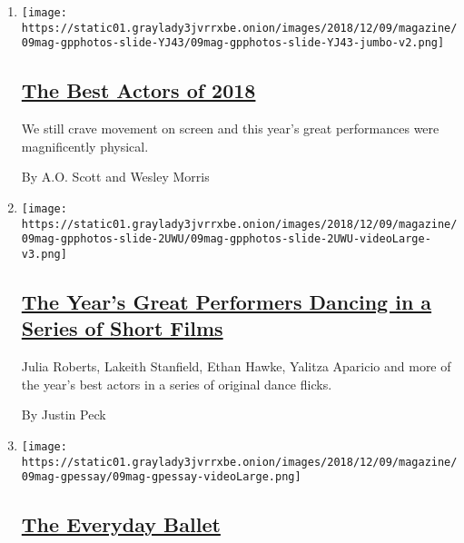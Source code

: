 \begin{enumerate}
\def\labelenumi{\arabic{enumi}.}
\item
  \texttt{[image: https://static01.graylady3jvrrxbe.onion/images/2018/12/09/magazine/09mag-gpphotos-slide-YJ43/09mag-gpphotos-slide-YJ43-jumbo-v2.png]}

  \hypertarget{the-best-actors-of-2018}{%
  \subsection{\texorpdfstring{\href{/interactive/2018/12/05/magazine/great-performers-best-actors-2018.html}{The
  Best Actors of
  2018}}{The Best Actors of 2018}}\label{the-best-actors-of-2018}}

  We still crave movement on screen and this year's great performances
  were magnificently physical.

  By A.O. Scott and Wesley Morris
\item
  \texttt{[image: https://static01.graylady3jvrrxbe.onion/images/2018/12/09/magazine/09mag-gpphotos-slide-2UWU/09mag-gpphotos-slide-2UWU-videoLarge-v3.png]}

  \hypertarget{the-years-great-performers-dancing-in-a-series-of-short-films}{%
  \subsection{\texorpdfstring{\href{/interactive/2018/12/05/magazine/great-performers-justin-peck-dance.html}{The
  Year's Great Performers Dancing in a Series of Short
  Films}}{The Year's Great Performers Dancing in a Series of Short Films}}\label{the-years-great-performers-dancing-in-a-series-of-short-films}}

  Julia Roberts, Lakeith Stanfield, Ethan Hawke, Yalitza Aparicio and
  more of the year's best actors in a series of original dance flicks.

  By Justin Peck
\item
  \texttt{[image: https://static01.graylady3jvrrxbe.onion/images/2018/12/09/magazine/09mag-gpessay/09mag-gpessay-videoLarge.png]}

  \hypertarget{the-everyday-ballet}{%
  \subsection{\texorpdfstring{\href{/interactive/2018/12/05/magazine/great-performers-everyday-ballet.html}{The
  Everyday Ballet}}{The Everyday Ballet}}\label{the-everyday-ballet}}


\end{enumerate}
